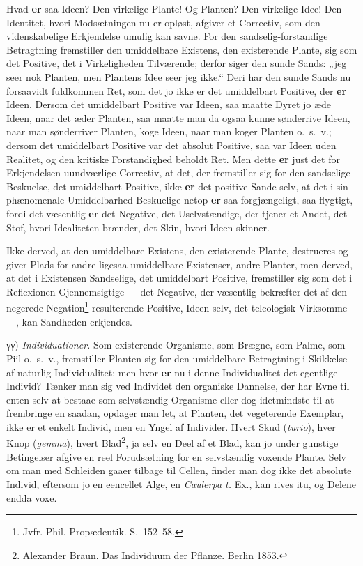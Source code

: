 \documentclass[11pt]{book}
\newcommand{\opage}[1]{\marginnote{\footnotesize\textit{[#1]}}}
\begin{document}
Hvad \textbf{er} saa Ideen? Den virkelige Plante! Og Planten? Den virkelige
Idee! Den Identitet, hvori Modsætningen nu er opløst, afgiver et Correctiv,
som den videnskabelige Erkjendelse umulig kan savne. For den
sandselig-forstandige Betragtning fremstiller den umiddelbare Existens, den
existerende Plante, sig som det Positive, det i Virkeligheden Tilværende;
derfor siger den sunde Sands: „jeg seer nok Planten, men Plantens Idee seer
jeg ikke.“ Deri har den sunde Sands nu forsaavidt fuldkommen Ret, som det jo
ikke er
\opage{313} \setcounter{footnote}{0}%
det umiddelbart Positive, der \textbf{er} Ideen. Dersom det umiddelbart
Positive var Ideen, saa maatte Dyret jo æde Ideen, naar det æder Planten,
saa maatte man da ogsaa kunne sønderrive Ideen, naar man sønderriver
Planten, koge Ideen, naar man koger Planten o.~s.~v.; dersom det umiddelbart
Positive var det absolut Positive, saa var Ideen uden Realitet, og den
kritiske Forstandighed beholdt Ret. Men dette \textbf{er} just det for
Erkjendelsen uundværlige Correctiv, at det, der fremstiller sig for den
sandselige Beskuelse, det umiddelbart Positive, ikke \textbf{er} det
positive Sande selv, at det i sin phænomenale Umiddelbarhed Beskuelige netop
\textbf{er} saa forgjængeligt, saa flygtigt, fordi det væsentlig
\textbf{er} det Negative, det Uselvstændige, der tjener et Andet, det Stof,
hvori Idealiteten brænder, det Skin, hvori Ideen skinner.

Ikke derved, at den umiddelbare Existens, den existerende Plante,
destrueres og giver Plads for andre ligesaa umiddelbare Existenser, andre
Planter, men derved, at det i Existensen Sandselige, det umiddelbart
Positive, fremstiller sig som det i Reflexionen Gjennemsigtige --- det
Negative, der væsentlig bekræfter det af den negerede
Negation\footnote{Jvfr. Phil. Propædeutik. S.~152--58.} resulterende
Positive, Ideen selv, det teleologisk Virksomme ---, kan Sandheden
erkjendes.

γγ) \emph{Individuationer.} Som existerende Organisme, som Brægne, som
Palme, som Piil o.~s.~v., fremstiller Planten sig for den umiddelbare
Betragtning i Skikkelse af naturlig Individualitet; men hvor \textbf{er} nu
i denne Individualitet det egentlige Individ? Tænker man sig ved Individet
den organiske Dannelse, der har Evne til enten selv at bestaae som
selvstændig Organisme eller dog idetmindste til at frembringe en saadan,
opdager man let, at Planten, det vegeterende Exemplar, ikke er et enkelt
Individ, men en Yngel
\opage{314} \setcounter{footnote}{0}%
af Individer. Hvert Skud (\textit{turio}), hver Knop (\textit{gemma}),
hvert Blad\footnote{Alexander Braun. Das Individuum der Pflanze. Berlin 1853.}, ja selv en Deel af et Blad, kan jo under gunstige
Betingelser afgive en reel Forudsætning for en selvstændig voxende
Plante. Selv om man med Schleiden gaaer tilbage til Cellen, finder
man dog ikke det absolute Individ, eftersom jo en eencellet Alge, en
\textit{Caulerpa t.} Ex., kan rives itu, og Delene endda voxe.
\end{document}
